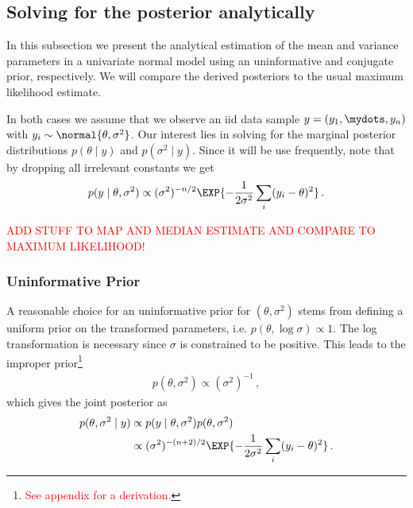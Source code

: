 \subsection{Solving for the posterior analytically}
In this subsection we present the analytical estimation of the mean and variance parameters
in a univariate normal model using an uninformative and conjugate prior, respectively.
We will compare the derived posteriors to the usual maximum likelihood estimate.

In both cases we assume that we observe an iid data sample $y = (y_1, \mydots, y_n)$
with $y_i \sim \normal{\theta, \sigma^2}$. Our interest lies in solving for the
marginal posterior distributions $p(\theta \mid y)$ and $p(\sigma^2 \mid y)$.
Since it will be use frequently, note that by dropping all irrelevant constants we get
\begin{align}
  p(y \mid \theta, \sigma^2) \propto (\sigma^2)^{-n/2} \EXP{-\frac{1}{2\sigma^2}\sum_i (y_i - \theta)^2} \,.
\end{align}

\textcolor{red}{ADD STUFF TO MAP AND MEDIAN ESTIMATE AND COMPARE TO MAXIMUM LIKELIHOOD!}

\subsubsection*{Uninformative Prior}
A reasonable choice for an uninformative prior for $(\theta, \sigma^2)$ stems
from defining a uniform prior on the transformed parameters, i.e. $p(\theta, \log \sigma) \propto 1$.
The log transformation is necessary since $\sigma$ is constrained to be positive.
This leads to the improper prior\footnote{\textcolor{red}{See appendix for a derivation.}}
\begin{align}
  p(\theta, \sigma^2) \propto (\sigma^2)^{-1} \,,
\end{align}
which gives the joint posterior as
\begin{align}
  p(\theta, \sigma^2 \mid y) &\propto p(y \mid \theta, \sigma^2) p(\theta, \sigma^2)\\
  &\propto (\sigma^2)^{-(n+2)/2} \EXP{-\frac{1}{2\sigma^2}\sum_i (y_i - \theta)^2} \,.
\end{align}

